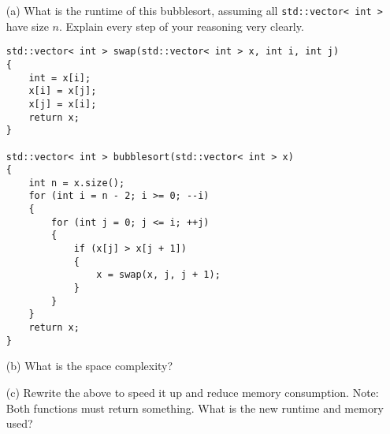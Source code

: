 
\begin{enumerate}[nosep]
\item[(a)]
What is the runtime of this bubblesort, assuming all
\verb!std::vector< int >! have size $n$.
Explain every step of your reasoning very clearly.
\begin{Verbatim}[frame=single,fontsize=\small]
std::vector< int > swap(std::vector< int > x, int i, int j)
{
    int = x[i];
    x[i] = x[j];
    x[j] = x[i];
    return x;
}
  
std::vector< int > bubblesort(std::vector< int > x)
{
    int n = x.size();
    for (int i = n - 2; i >= 0; --i)
    {
        for (int j = 0; j <= i; ++j)
        {
            if (x[j] > x[j + 1])
            {
                x = swap(x, j, j + 1);
            }
        }
    }
    return x;
}
\end{Verbatim}
\item[(b)]
What is the space complexity?
\item[(c)]
Rewrite the above to speed it up and reduce memory consumption.
Note: Both functions must return something.
What is the new runtime and memory used?
\end{enumerate}
